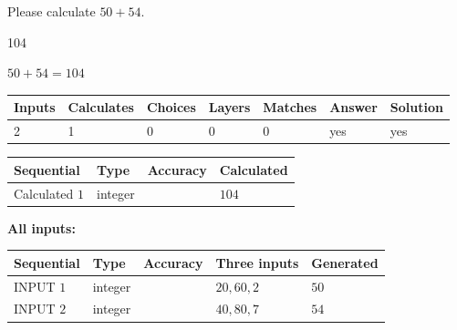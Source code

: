 \documentclass[12pt]{article}
\begin{document}
  
 
Please calculate $ %
50 +  %
54 $.
 
 
 
\noindent{}
 
 

104
 
 
\noindent{}
 
 

 
 
 
\noindent{}
 
 

$ %
50 +  %
54=   %
104$
 
 
\noindent{}
 
 

 
   
   
   
   
\noindent\begin{tabular}{|l|l|l|l|l|l|l|}
 \hline
Inputs & Calculates & Choices & Layers & Matches & Answer & Solution \\ \hline
 2  & 
 1  & 
 0
  & 
 0  & 
 0  & 
  yes & 
  yes 
  \\ \hline
 \end{tabular}
   
   
   
   
\noindent{}
   
   
  
  
\noindent\begin{tabular}{|l|l|l|l|}
\hline
 Sequential & Type & Accuracy & Calculated \\ 
\hline
 
 
  Calculated $  1 $ & integer &  & 
  $ 104 $ 
 \\  \hline  
 \end{tabular}
   
   
   
   
\noindent\vspace{0.1in}\hspace{-0.08in} {\textbf{\Large{All inputs: }}}
   
   
  
  
\noindent\begin{tabular}{|l|l|l|l|l|}
\hline
 Sequential & Type & Accuracy & Three inputs & Generated \\ 
\hline
 
 
  INPUT $  1 $ & integer &  & $
 20
 , 
 60
 , 
 2
 $ & $ 50 $ 
 \\  \hline  
 
 
  INPUT $  2 $ & integer &  & $
 40
 , 
 80
 , 
 7
 $ & $ 54 $ 
 \\  \hline  
 \end{tabular}
   
\end{document}
